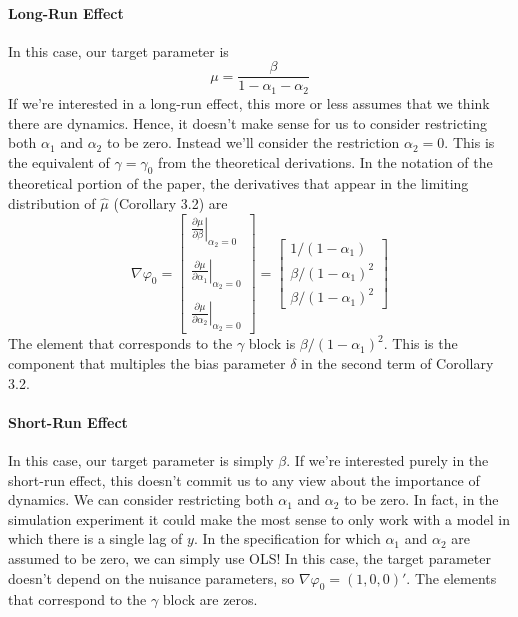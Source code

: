 \documentclass[12pt]{article}
\begin{document}
\paragraph{Long-Run Effect} In this case, our target parameter is
  $$\mu = \frac{\beta}{1 - \alpha_1 - \alpha_2}$$
If we're interested in a long-run effect, this more or less assumes that we think there are dynamics. Hence, it doesn't make sense for us to consider restricting both $\alpha_1$ and $\alpha_2$ to be zero. Instead we'll consider the restriction $\alpha_2 = 0$. This is the equivalent of $\gamma = \gamma_0$ from the theoretical derivations. In the notation of the theoretical portion of the paper, the derivatives that appear in the limiting distribution of $\widehat{\mu}$ (Corollary 3.2) are
  $$\nabla \varphi_0 = \left[\begin{array}{c} \left.\displaystyle\frac{\partial \mu}{\partial \beta}\right|_{\alpha_2 = 0}\\\\
\left.\displaystyle\frac{\partial \mu}{\partial \alpha_1}\right|_{\alpha_2 = 0}\\\\
\left.\displaystyle\frac{\partial \mu}{\partial \alpha_2}\right|_{\alpha_2 = 0}
  \end{array}\right] = \left[\begin{array}{c} 
  1/(1-\alpha_1) \\
  \beta/(1-\alpha_1)^2\\
  \beta/(1-\alpha_1)^2
  \end{array}\right]$$
The element that corresponds to the $\gamma$ block is $\beta/(1-\alpha_1)^2$. This is the component that multiples the bias parameter $\delta$ in the second term of Corollary 3.2.

\paragraph{Short-Run Effect} In this case, our target parameter is simply $\beta$. If we're interested purely in the short-run effect, this doesn't commit us to any view about the importance of dynamics. We can consider restricting both $\alpha_1$ and $\alpha_2$ to be zero. In fact, in the simulation experiment it could make the most sense to only work with a model in which there is a single lag of $y$. In the specification for which $\alpha_1$ and $\alpha_2$ are assumed to be zero, we can simply use OLS! In this case, the target parameter doesn't depend on the nuisance parameters, so $\nabla \varphi_0 = (1,0,0)'$. The elements that correspond to the $\gamma$ block are zeros.
\end{document}
